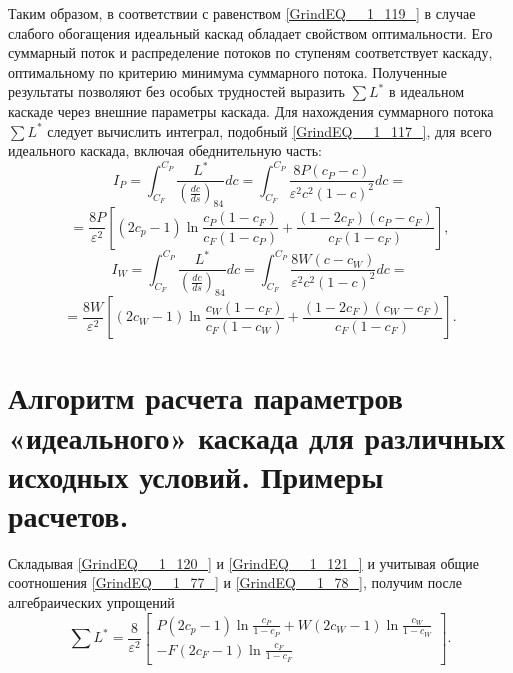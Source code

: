 Таким образом, в соответствии с равенством \ref{GrindEQ__1_119_} в случае слабого обогащения идеальный каскад обладает свойством оптимальности. Его суммарный поток и распределение потоков по ступеням соответствует каскаду, оптимальному по критерию минимума суммарного потока. Полученные результаты позволяют без особых трудностей выразить $\sum L ^{*} $ в идеальном каскаде через внешние параметры каскада. Для нахождения суммарного потока $\sum L ^{*} $ следует вычислить интеграл, подобный \ref{GrindEQ__1_117_}, для всего идеального каскада, включая обеднительную часть:
\[I_{P} =\int _{C_{F} }^{C_{P} }\frac{L^{*} }{\left(\frac{dc}{ds} \right)_{84} } dc= \int _{C_{F} }^{C_{P} }\frac{8P(c_{P} -c)}{\varepsilon ^{2} c^{2} (1-c)^{2} } dc= \] 
\begin{equation} \label{GrindEQ__1_120_} 
=\frac{8P}{\varepsilon ^{2} } \left[(2c_{p} -1)\ln \frac{c_{P} (1-c_{F} )}{c_{F} (1-c_{P} )} +\frac{(1-2c_{F} )(c_{P} -c_{F} )}{c_{F} (1-c_{F} )} \right],       
\end{equation} 
\[I_{W} =\int _{C_{F} }^{C_{P} }\frac{L^{*} }{\left(\frac{dc}{ds} \right)_{84} } dc= \int _{C_{F} }^{C_{P} }\frac{8W(c-c_{W} )}{\varepsilon ^{2} c^{2} (1-c)^{2} } dc= \] 
\begin{equation} \label{GrindEQ__1_121_} 
=\frac{8W}{\varepsilon ^{2} } \left[(2c_{W} -1)\ln \frac{c_{W} (1-c_{F} )}{c_{F} (1-c_{W} )} +\frac{(1-2c_{F} )(c_{W} -c_{F} )}{c_{F} (1-c_{F} )} \right].     
\end{equation} 







\section{Алгоритм расчета параметров «идеального» каскада для различных исходных условий. Примеры расчетов.}


Складывая \ref{GrindEQ__1_120_} и \ref{GrindEQ__1_121_} и учитывая общие соотношения \ref{GrindEQ__1_77_} и \ref{GrindEQ__1_78_}, получим после алгебраических упрощений
\begin{equation} \label{GrindEQ__1_122_} 
\sum L^{*}  =\frac{8}{\varepsilon ^{2} } \left[\begin{array}{l} {P(2c_{p} -1)\ln \frac{c_{P} }{1-c_{P} } +W(2c_{W} -1)\ln \frac{c_{W} }{1-c_{W} } } \\ {-F(2c_{F} -1)\ln \frac{c_{F} }{1-c_{F} } } \end{array}\right].              
\end{equation} 

